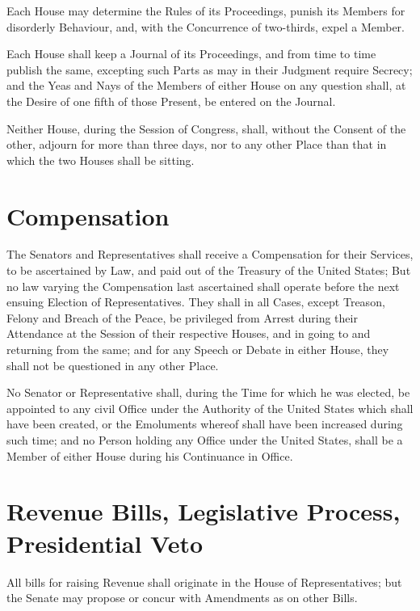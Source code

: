 \documentclass{constitution}
\begin{document}
Each House may determine the Rules of its Proceedings,
punish its Members for disorderly Behaviour,
and, with the Concurrence of two-thirds, expel a Member.

Each House shall keep a Journal of its Proceedings,
and from time to time publish the same,
excepting such Parts as may in their Judgment require Secrecy;
and the Yeas and Nays of the Members of either House on any question shall,
at the Desire of one fifth of those Present,
be entered on the Journal.

Neither House, during the Session of Congress, shall, without the Consent of the other,
adjourn for more than three days,
nor to any other Place than that in which the two Houses shall be sitting.

\section{Compensation}
The Senators and Representatives shall receive a Compensation for their Services,
to be ascertained by Law, and paid out of the Treasury of the United States;
But no law varying the Compensation last ascertained
shall operate before the next ensuing Election of Representatives.
They shall in all Cases, except Treason, Felony and Breach of the Peace,
be privileged from Arrest during their Attendance at the Session of their respective Houses,
and in going to and returning from the same;
and for any Speech or Debate in either House, they shall not be questioned in any other Place.

No Senator or Representative shall, during the Time for which he was elected,
be appointed to any civil Office under the Authority of the United States
which shall have been created,
or the Emoluments whereof shall have been increased during such time;
and no Person holding any Office under the United States,
shall be a Member of either House during his Continuance in Office.

\section{Revenue Bills, Legislative Process, Presidential Veto}
All bills for raising Revenue shall originate in the House of Representatives;
but the Senate may propose or concur with Amendments as on other Bills.
\end{document}
